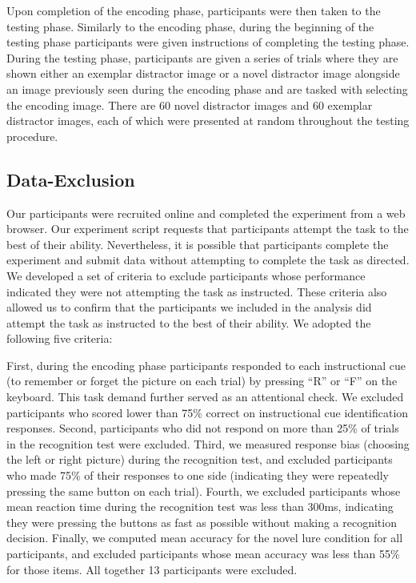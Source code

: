 \documentclass[
  man,floatsintext]{apa6}
\begin{document}
Upon completion of the encoding phase, participants were then taken to the testing phase. Similarly to the encoding phase, during the beginning of the testing phase participants were given instructions of completing the testing phase. During the testing phase, participants are given a series of trials where they are shown either an exemplar distractor image or a novel distractor image alongside an image previously seen during the encoding phase and are tasked with selecting the encoding image. There are 60 novel distractor images and 60 exemplar distractor images, each of which were presented at random throughout the testing procedure.

\hypertarget{data-exclusion}{%
\subsection{Data-Exclusion}\label{data-exclusion}}

Our participants were recruited online and completed the experiment from a web browser. Our experiment script requests that participants attempt the task to the best of their ability. Nevertheless, it is possible that participants complete the experiment and submit data without attempting to complete the task as directed. We developed a set of criteria to exclude participants whose performance indicated they were not attempting the task as instructed. These criteria also allowed us to confirm that the participants we included in the analysis did attempt the task as instructed to the best of their ability. We adopted the following five criteria:

First, during the encoding phase participants responded to each instructional cue (to remember or forget the picture on each trial) by pressing ``R'' or ``F'' on the keyboard. This task demand further served as an attentional check. We excluded participants who scored lower than 75\% correct on instructional cue identification responses. Second, participants who did not respond on more than 25\% of trials in the recognition test were excluded. Third, we measured response bias (choosing the left or right picture) during the recognition test, and excluded participants who made 75\% of their responses to one side (indicating they were repeatedly pressing the same button on each trial). Fourth, we excluded participants whose mean reaction time during the recognition test was less than 300ms, indicating they were pressing the buttons as fast as possible without making a recognition decision. Finally, we computed mean accuracy for the novel lure condition for all participants, and excluded participants whose mean accuracy was less than 55\% for those items. All together 13 participants were excluded.
\end{document}
